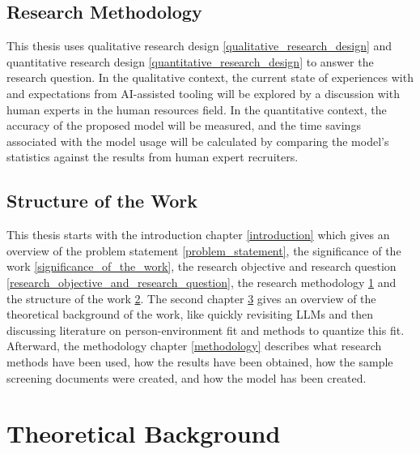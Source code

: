 \documentclass[draft,final]{thesisclass} %
\begin{document}
\section{Research Methodology} \label{research_methodology}
This thesis uses qualitative research design \ref{qualitative_research_design} and quantitative research design \ref{quantitative_research_design} to answer the research question.
In the qualitative context, the current state of experiences with and expectations from \acs{AI}-assisted tooling will be explored by a discussion with human experts in the human resources field.
In the quantitative context, the accuracy of the proposed model will be measured, and the time savings associated with the model usage will be calculated by comparing the model's statistics against the results from human expert recruiters.

\section{Structure of the Work} \label{structure_of_the_work}
This thesis starts with the introduction chapter \ref{introduction} which gives an overview of the problem statement \ref{problem_statement}, the significance of the work \ref{significance_of_the_work}, the research objective and research question \ref{research_objective_and_research_question}, the research methodology \ref{research_methodology} and the structure of the work \ref{structure_of_the_work}.
The second chapter \ref{theoretical_background} gives an overview of the theoretical background of the work, like quickly revisiting \gls{LLM}s and then discussing literature on person-environment fit and methods to quantize this fit.
Afterward, the methodology chapter \ref{methodology} describes what research methods have been used, how the results have been obtained, how the sample screening documents were created, and how the model has been created.


\chapter{Theoretical Background} \label{theoretical_background}
\end{document}
